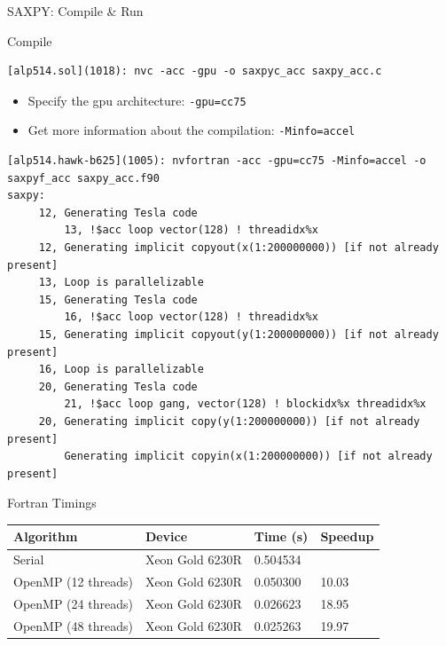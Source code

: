 \documentclass[10pt,t]{beamer}
\begin{document}
\begin{frame}{SAXPY: Compile \& Run}
  \vspace{-0.5cm}
  \begin{exampleblock}{Compile}
    \begin{lstlisting}[basicstyle=\fontsize{6}{8}\selectfont\ttfamily]
[alp514.sol](1018): nvc -acc -gpu -o saxpyc_acc saxpy_acc.c
    \end{lstlisting}
    \begin{itemize}
      \item Specify the gpu architecture: \lstinline[basicstyle=\small\ttfamily]|-gpu=cc75| 
      \item Get more information about the compilation: \lstinline[basicstyle=\small\ttfamily]|-Minfo=accel|
    \end{itemize}
    \begin{lstlisting}[basicstyle=\fontsize{6}{8}\selectfont\ttfamily]
[alp514.hawk-b625](1005): nvfortran -acc -gpu=cc75 -Minfo=accel -o saxpyf_acc saxpy_acc.f90
saxpy:
     12, Generating Tesla code
         13, !$acc loop vector(128) ! threadidx%x
     12, Generating implicit copyout(x(1:200000000)) [if not already present]
     13, Loop is parallelizable
     15, Generating Tesla code
         16, !$acc loop vector(128) ! threadidx%x
     15, Generating implicit copyout(y(1:200000000)) [if not already present]
     16, Loop is parallelizable
     20, Generating Tesla code
         21, !$acc loop gang, vector(128) ! blockidx%x threadidx%x
     20, Generating implicit copy(y(1:200000000)) [if not already present]
         Generating implicit copyin(x(1:200000000)) [if not already present]
    \end{lstlisting}
  \end{exampleblock}
  \framebreak
  \begin{exampleblock}{Fortran Timings}
    {\scriptsize
    \begin{center}
      \begin{tabular}{|bbbb|}
        \hline
        \rowcolor{lublue}Algorithm & Device & Time (s) & Speedup \\
        \hline
         Serial & Xeon Gold 6230R & 0.504534 & \\
         \hline
         OpenMP (12 threads) & Xeon Gold 6230R & 0.050300 & 10.03 \\
         OpenMP (24 threads) & Xeon Gold 6230R & 0.026623 & 18.95 \\
         OpenMP (48 threads) & Xeon Gold 6230R & 0.025263 & 19.97 \\

\end{tabular}
\end{center}}
\end{exampleblock}
\end{frame}
\end{document}
